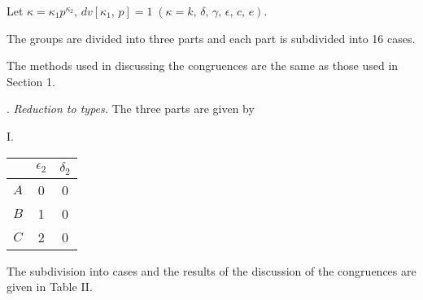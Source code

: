 \documentclass[oneside]{article}
\begin{document}
Let $\kappa = \kappa_1 p^{\kappa_2},\, dv[\kappa_1,\, p] = 1\; (\kappa = k,\,
\delta,\, \gamma,\, \epsilon,\, c,\, e)$.

The groups are divided into three parts and each part is subdivided into
16 cases.

The methods used in discussing the congruences are the same as those
used in Section 1.

. \textit{Reduction to types.} The three parts are given by

\begin{center}
\large I. \normalsize

\smallskip
\begin{tabular}{|c|c|c|} \hline
     & $\epsilon_2$ & $\delta_2$ \\ \hline
 $A$ &      0       &      0     \\ \hline
 $B$ &      1       &      0     \\ \hline
 $C$ &      2       &      0     \\ \hline
\end{tabular}
\end{center}

The subdivision into cases and the results of the discussion of the
congruences are given in Table II.
\end{document}
